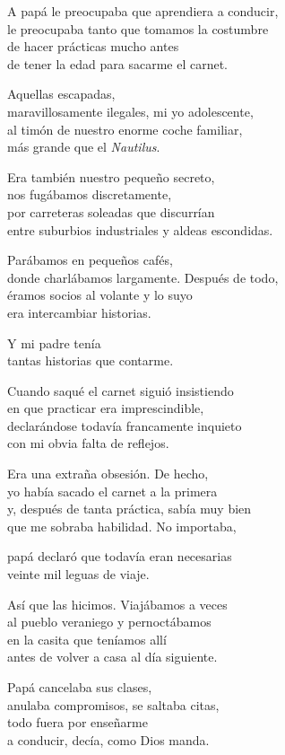 \begin{versopropio}
A papá le preocupaba que aprendiera a conducir,\\
le preocupaba tanto que tomamos la costumbre\\
de hacer prácticas mucho antes\\
de tener la edad para sacarme el carnet.

Aquellas escapadas,\\
maravillosamente ilegales, mi yo adolescente,\\
al timón de nuestro enorme coche familiar,\\
más grande que el \emph{Nautilus}.

Era también nuestro pequeño secreto,\\
nos fugábamos discretamente,\\
por carreteras soleadas que discurrían\\
entre suburbios industriales y aldeas escondidas.

Parábamos en pequeños cafés,\\
donde charlábamos largamente. Después de todo,\\
éramos socios al volante y lo suyo\\
era intercambiar historias.

Y mi padre tenía\\
tantas historias que contarme.

Cuando saqué el carnet siguió insistiendo\\
en que practicar era imprescindible,\\
declarándose todavía francamente inquieto\\
con mi obvia falta de reflejos.

Era una extraña obsesión. De hecho,\\
yo había sacado el carnet a la primera\\
y, después de tanta práctica, sabía muy bien\\
que me sobraba habilidad. No importaba,

papá declaró que todavía eran necesarias\\
veinte mil leguas de viaje.

Así que las hicimos. Viajábamos a veces\\
al pueblo veraniego y pernoctábamos\\
en la casita que teníamos allí\\
antes de volver a casa al día siguiente.

Papá cancelaba sus clases,\\
anulaba compromisos, se saltaba citas,\\
todo fuera por enseñarme\\
a conducir, decía, como Dios manda.


\end{versopropio}
